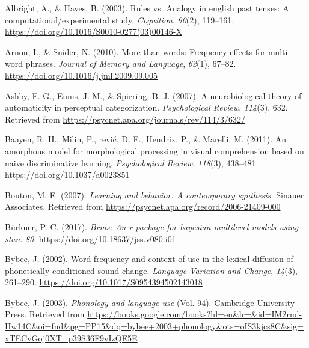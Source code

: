 \documentclass[
  man,floatsintext]{apa6}
\newlength{\cslhangindent}
\newlength{\cslentryspacingunit} %
\newenvironment{CSLReferences}[2] %
 {%
  \setlength{\parindent}{0pt}
  \ifodd #1
  \let\oldpar\par
  \def\par{\hangindent=\cslhangindent\oldpar}
  \fi
  \setlength{\parskip}{#2\cslentryspacingunit}
 }%
 {}
\begin{document}
\hypertarget{refs}{}
\begin{CSLReferences}{1}{0}
\leavevmode{}%
Albright, A., \& Hayes, B. (2003). Rules vs. Analogy in english past tenses: A computational/experimental study. \emph{Cognition}, \emph{90}(2), 119--161. \url{https://doi.org/10.1016/S0010-0277(03)00146-X}

\leavevmode{}%
Arnon, I., \& Snider, N. (2010). More than words: Frequency effects for multi-word phrases. \emph{Journal of Memory and Language}, \emph{62}(1), 67--82. \url{https://doi.org/10.1016/j.jml.2009.09.005}

\leavevmode{}%
Ashby, F. G., Ennis, J. M., \& Spiering, B. J. (2007). A neurobiological theory of automaticity in perceptual categorization. \emph{Psychological Review}, \emph{114}(3), 632. Retrieved from \url{https://psycnet.apa.org/journals/rev/114/3/632/}

\leavevmode{}%
Baayen, R. H., Milin, P., rević, D. F., Hendrix, P., \& Marelli, M. (2011). An amorphous model for morphological processing in visual comprehension based on naive discriminative learning. \emph{Psychological Review}, \emph{118}(3), 438--481. \url{https://doi.org/10.1037/a0023851}

\leavevmode{}%
Bouton, M. E. (2007). \emph{Learning and behavior: A contemporary synthesis.} Sinauer Associates. Retrieved from \url{https://psycnet.apa.org/record/2006-21409-000}

\leavevmode{}%
Bürkner, P.-C. (2017). \emph{{\textbraceleft}Brms{\textbraceright}: An {\textbraceleft}r{\textbraceright} package for {\textbraceleft}bayesian{\textbraceright} multilevel models using {\textbraceleft}stan{\textbraceright}}. \emph{80}. \url{https://doi.org/10.18637/jss.v080.i01}

\leavevmode{}%
Bybee, J. (2002). Word frequency and context of use in the lexical diffusion of phonetically conditioned sound change. \emph{Language Variation and Change}, \emph{14}(3), 261--290. \url{https://doi.org/10.1017/S0954394502143018}

\leavevmode{}%
Bybee, J. (2003). \emph{Phonology and language use} (Vol. 94). Cambridge University Press. Retrieved from \url{https://books.google.com/books?hl=en\&lr=\&id=IM2rnd-Hw14C\&oi=fnd\&pg=PP15\&dq=bybee+2003+phonology\&ots=oIS3kjcs8C\&sig=xTECvGoj0XT_p39S36F9vIzQE5E}


\end{CSLReferences}
\end{document}
